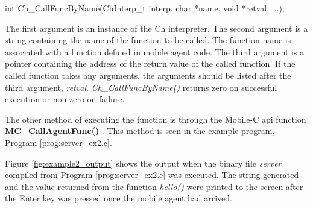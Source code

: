 \documentclass[11pt]{report}
\begin{document}
int Ch\_CallFuncByName(ChInterp\_t interp, char *name, void *retval, ...);

The first argument is an instance of the Ch interpreter. 
The second argument is a string containing the name of the function to be 
called. 
The function name is associated with a function defined in mobile agent code. 
The third argument is a pointer containing the address of the return value of 
the called function. 
If the called function takes any arguments, the arguments should be listed 
after the third argument, \textit{retval}. 
\textit{Ch\_CallFuncByName()} returns zero on successful execution or 
non-zero on failure.

The other method of executing the function is through the Mobile-C
api function {\bf MC\_CallAgentFunc()} . 
This method is seen in the example program, Program \ref{prog:server_ex2.c}.

Figure \vref{fig:example2_output} shows the output when the binary file 
\textit{server} compiled from Program \ref{prog:server_ex2.c} was executed. 
The string generated and the value returned from the function \textit{hello()} 
were printed to the screen after the Enter key was pressed once the mobile 
agent had arrived. 



\end{document}
